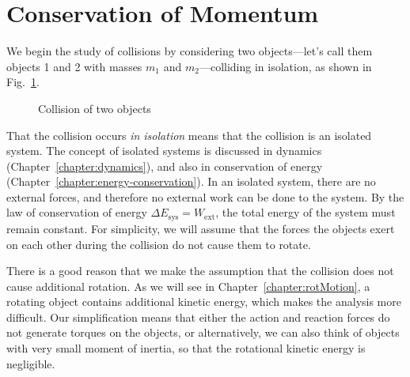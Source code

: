 \section{Conservation of Momentum}

We begin the study of collisions by considering two objects---let's call them
objects 1 and 2 with masses $m_1$ and $m_2$---colliding in isolation, as shown
in Fig.~\ref{collision1}.
\begin{figure}[ht]
  \centering
  \caption{Collision of two objects}
  \label{collision1}
\end{figure}
That the collision occurs \emph{in isolation} means that the collision is an
isolated system. The concept of isolated systems is discussed in dynamics
(Chapter~\ref{chapter:dynamics}), and also in conservation of energy
(Chapter~\ref{chapter:energy-conservation}). In an isolated system, there are
no external forces, and therefore no external work can be done to the system.
By the law of conservation of energy $\Delta E_\text{sys}=W_\text{ext}$, the
total energy of the system must remain constant. For simplicity, we will assume
that the forces the objects exert on each other during the collision do not
cause them to rotate.
\begin{remark}
  There is a good reason that we make the assumption that the collision does
  not cause additional rotation. As we will see in
  Chapter~\ref{chapter:rotMotion}, a rotating object contains additional kinetic
  energy, which makes the analysis more difficult. Our simplification means that
  either the action and reaction forces do not generate torques on the
  objects, or alternatively, we can also think of objects with very small moment
  of inertia, so that the rotational kinetic energy is negligible.
\end{remark}

